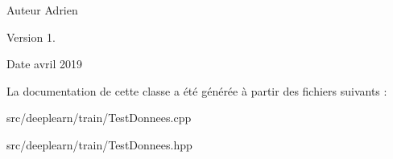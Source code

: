 \begin{DoxyAuthor}{Auteur}
Adrien 
\end{DoxyAuthor}
\begin{DoxyVersion}{Version}
1. 
\end{DoxyVersion}
\begin{DoxyDate}{Date}
avril 2019 
\end{DoxyDate}


La documentation de cette classe a été générée à partir des fichiers suivants \+:\begin{DoxyCompactItemize}
\item 
src/deeplearn/train/Test\+Donnees.\+cpp\item 
src/deeplearn/train/Test\+Donnees.\+hpp\end{DoxyCompactItemize}
